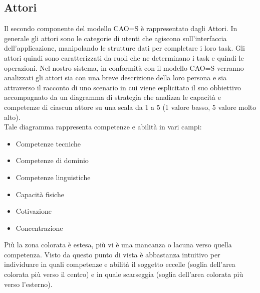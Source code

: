 \documentclass[12pt,a4paper]{report}
\begin{document}
\subsection{Attori}
Il secondo componente del modello CAO=S è rappresentato dagli Attori. In generale gli attori sono le categorie di utenti che agiscono sull'interfaccia dell'applicazione, manipolando le strutture dati per completare i loro task. Gli attori quindi sono caratterizzati da ruoli che ne determinano i task e quindi le operazioni. Nel nostro sistema, in conformità con il modello CAO=S verranno analizzati gli attori sia con una breve descrizione della loro persona e sia attraverso il racconto di uno scenario in cui viene esplicitato il suo obbiettivo accompagnato da un diagramma di strategia che analizza le capacità e competenze di ciascun attore su una scala da 1 a 5 (1 valore basso, 5 valore molto alto).\\
Tale diagramma rappresenta competenze e abilità in vari campi:
\begin{itemize}
  \item Competenze tecniche
  \item Competenze di dominio
  \item Competenze linguistiche
  \item Capacità fisiche
  \item Cotivazione
  \item Concentrazione
\end{itemize}
Più la zona colorata è estesa, più vi è una mancanza o lacuna verso quella competenza. Visto da questo punto di vista è abbastanza intuitivo per individuare in quali competenze e abilità il soggetto eccelle (soglia dell'area colorata più verso il centro) e in quale scarseggia (soglia dell'area colorata più verso l'esterno).
\newpage
\end{document}
